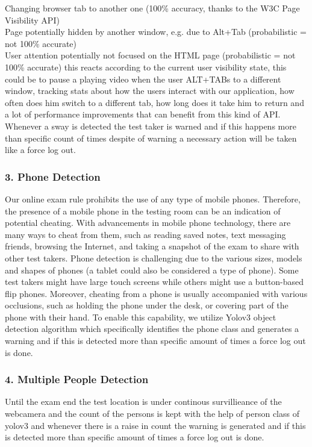 \documentclass[12pt]{report}
\begin{document}
Changing browser tab to another one (100\% accuracy, thanks to the W3C Page Visibility API)\\

Page potentially hidden by another window, e.g. due to Alt+Tab (probabilistic = not 100\% accurate)\\
User attention potentially not focused on the HTML page (probabilistic = not 100\% accurate)
this reacts according to the current user visibility state, this could be to pause a playing video when the user ALT+TABs to a different window, tracking stats about how the users interact with our application, how often does him switch to a different tab, how long does it take him to return and a lot of performance improvements that can benefit from this kind of API. Whenever a sway is detected the test taker is warned and if this happens more than specific count of times despite of warning a necessary action will be taken like a force log out.\\

\subsubsection{3. Phone Detection}
Our online exam rule prohibits the use of any type of
mobile phones. Therefore, the presence of a mobile phone in
the testing room can be an indication of potential cheating.
With advancements in mobile phone technology, there are
many ways to cheat from them, such as reading saved notes,
text messaging friends, browsing the Internet, and taking a
snapshot of the exam to share with other test takers.
Phone detection is challenging due to the various sizes,
models and shapes of phones (a tablet could also be considered
a type of phone). Some test takers might have large touch
screens while others might use a button-based flip phones.
Moreover, cheating from a phone is usually accompanied with
various occlusions, such as holding the phone under the desk,
or covering part of the phone with their hand.
To enable this capability, we utilize Yolov3 object detection algorithm which specifically identifies the phone class and generates a warning and if this is detected more than specific amount of times a force log out is done.
\subsubsection{4. Multiple People Detection}
Until the exam end the test location is under continous survillieance of the webcamera and the count of the persons is kept with the help of person class of yolov3 and whenever there is a raise in count the warning is generated and  if this is detected more than specific amount of times a force log out is done.
\end{document}
